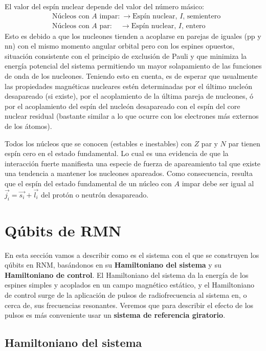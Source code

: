 \documentclass[a4paper,11pt]{book} %
\numberwithin{equation}{chapter}
\begin{document}
El valor del espín nuclear depende del valor del número másico:
\begin{align*}
& \text{Núcleos con }A \text{ impar:} ~ \longrightarrow \text{Espín nuclear, } I \text{, semientero}   \\
& \text{Núcleos con }A \text{ par:} ~~~ \,\, \, \longrightarrow \text{Espín nuclear, } I \text{, entero}
\end{align*}
Esto es debido a que los nucleones tienden a acoplarse en parejas de iguales (pp y nn) con el mismo momento angular orbital pero con los espines opuestos, situación consistente con el principio de exclusión de Pauli y que minimiza la energía potencial del sistema permitiendo un mayor solapamiento de las funciones de onda de los nucleones. Teniendo esto en cuenta, es de esperar que usualmente las propiedades magnéticas nucleares estén determinadas por el último nucleón desapareado (si existe), por el acoplamiento de la última pareja de nucleones, ó por el acoplamiento del espín del nucleón desapareado con el espín del core nuclear residual (bastante similar a lo que ocurre con los electrones más externos de los átomos).

Todos los núcleos que se conocen (estables e inestables) con $Z$ par y $N$ par tienen espín cero en el estado fundamental. Lo cual es una evidencia de que la interacción fuerte manifiesta una especie de fuerza de apareamiento tal que existe una tendencia a mantener los nucleones apareados. Como consecuencia, resulta que el espín del estado fundamental de un núcleo con $A$ impar debe ser igual al $\vec{j_i} = \vec{s_i} + \vec{l_i}$ del protón o neutrón desapareado.


	
	\section{Qúbits de RMN} 

En esta sección vamos a describir como es el sistema con el que se construyen los qúbits en RNM, basándonos en su \textbf{Hamiltoniano del sistema} y su \textbf{Hamiltoniano de control}. El Hamiltoniano del sistema da la energía de los espines simples y acoplados en un campo magnético estático, y el Hamiltoniano de control surge de la aplicación de pulsos de radiofrecuencia al sistema en, o cerca de, sus frecuencias resonantes. Veremos que para describir el efecto de los pulsos es más conveniente usar un \textbf{sistema de referencia giratorio}.


		\subsection{Hamiltoniano del sistema} \label{sec_subsub_Harware_NMR_H_sys}
\end{document}
